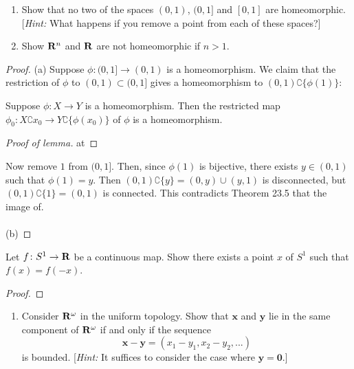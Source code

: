 \newpage
\begin{problem}[Munkres \S24, Ex.\,1(ac)]
\begin{enumerate}[noitemsep]
\item[(a)] Show that no two of the spaces $(0,1)$, $(0,1]$ and
  $[0,1]$ are homeomorphic. [\emph{Hint:} What happens if you
  remove a point from each of these spaces?]
\item[(c)] Show $\mathbf{R}^n$ and $\mathbf{R}$ are not homeomorphic if $n>1$.
\end{enumerate}
\end{problem}
\begin{proof}
(a) Suppose $\phi\colon (0,1]\to (0,1)$ is a homeomorphism. We
claim that the restriction of $\phi$ to $(0,1)\subset(0,1]$ gives
a homeomorphism to $(0,1)\complement\{\phi(1)\}$:
\begin{lemma}
Suppose $\phi\colon X\to Y$ is a homeomorphism. Then the
restricted map $\phi_0\colon X\complement{x_0}\to
Y\complement\{\phi(x_0)\}$ of $\phi$ is a homeomorphism.
\end{lemma}
\begin{proof}[Proof of lemma]
\renewcommand\qedsymbol{$\clubsuit$}
at
\end{proof}
Now remove $1$ from $(0,1]$. Then, since $\phi(1)$ is bijective,
there exists $y\in(0,1)$ such that $\phi(1)=y$. Then
$(0,1)\complement\{y\}=(0,y)\cup(y,1)$ is disconnected, but
$(0,1)\complement\{1\}=(0,1)$ is connected. This contradicts
Theorem 23.5 that the image of.
\\\\
(b)
\end{proof}
\newpage
\begin{problem}[Munkres \S24, Ex.\,2]
Let $f\colon S^1\to\mathbf{R}$ be a continuous map. Show there exists a
point $x$ of $S^1$ such that $f(x)=f(-x)$.
\end{problem}
\begin{proof}
\end{proof}
\newpage
\begin{problem}[Munkres \S25, Ex.\,2(b)]
\begin{enumerate}[noitemsep]
\item[(b)] Consider $\mathbf{R}^\omega$ in the uniform topology. Show
  that $\mathbf{x}$ and $\mathbf{y}$ lie in the same component of
  $\mathbf{R}^\omega$ if and only if the sequence
  \[
    \mathbf{x}-\mathbf{y}=(x_1-y_1,x_2-y_2,...)
  \]
  is bounded. [\emph{Hint:} It suffices to consider the case
  where $\mathbf{y}=\mathbf{0}$.]
\end{enumerate}
\end{problem}
